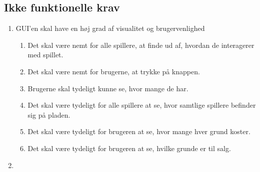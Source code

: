 \subsection{Ikke funktionelle krav}
\begin{enumerate}
\subsubsection{Visuelt}
    \item GUI'en skal have en høj grad af visualitet og brugervenlighed
    \begin{enumerate}
        \item Det skal være nemt for alle spillere, at finde ud af, hvordan de interagerer med spillet.
        \item Det skal være nemt for brugerne, at trykke på knappen.
        \item Brugerne skal tydeligt kunne se, hvor mange {} de har.
        \item Det skal være tydeligt for alle spillere at se, hvor samtlige spillere befinder sig på pladen.
        \item Det skal være tydeligt for brugeren at se, hvor mange {} hver grund koster.
        \item Det skal være tydeligt for brugeren at se, hvilke grunde er til salg.
    \end{enumerate}
    \item 
    
\end{enumerate}
